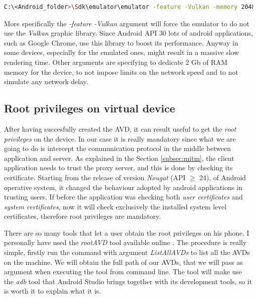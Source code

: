 \begin{lstlisting}[language=bash, caption={run\_AVD.bat}]
	C:\<Android_folder>\Sdk\emulator\emulator -feature -Vulkan -memory 2048 -netdelay none -netspeed full -avd Pixel_3a_API_33_-_Data_Leak_Detection
\end{lstlisting}
		\par More specifically the \textit{-feature -Vulkan} argument will force the emulator to do not use the \textit{Vulkan} graphic library. Since Android API 30 lots of android applications, such as Google Chrome, use this library to boost its performance. Anyway in some devices, especially for the emulated ones, might result in a massive slow rendering time. Other arguments are specifying to dedicate 2 Gb of RAM memory for the device, to not impose limits on the network speed and to not simulate any network delay.
			
		\subsection{Root privileges on virtual device}
			\par After having succesfully created the AVD, it can result useful to get the \textit{root privileges} on the device. In our case it is really mandatory since what we are going to do is intercept the communication protocol in the middle between application and server. As explained in the Section \ref{subsec:mitm}, the client application needs to trust the proxy server, and this is done by checking its certificate. Starting from the release of version \textit{Nougat} (API $\ge$ 24), of Android operative system, it changed the behaviour adopted by android applications in trusting users. If before the application was checking both \textit{user certificates} and \textit{system certificates}, now it will check exclusively the installed system level certificates, therefore root privileges are mandatory. \newline
			\par There are so many tools that let a user obtain the root privileges on his phone. I personally have used the \textit{rootAVD} tool available online \cite{rootAVD}. The procedure is really simple, firstly run the command with argument \textit{ListAllAVDs} to list all the AVDs on the machine. We will obtain the full path of our AVDs, that we will pass as argument when executing the tool from command line. The tool will make use the \textit{adb} tool that Android Studio brings together with its development tools, so it is worth it to explain what it is.
		
